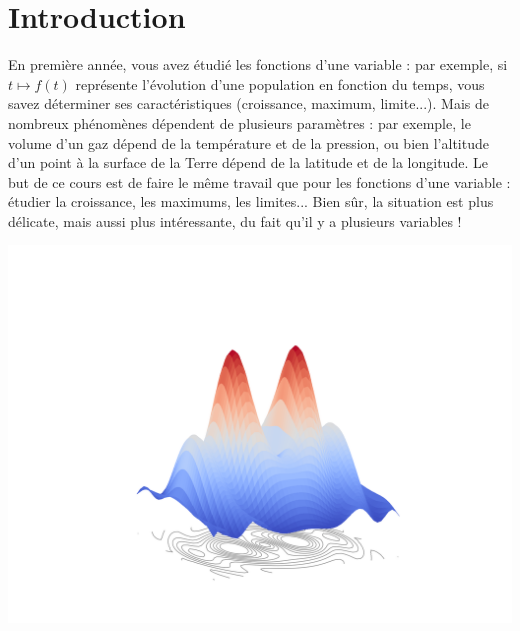 \documentclass[11pt, class=report,crop=false]{standalone}
\begin{document}
\newcommand{\myscale}{1}





\section{Introduction}

En première année, vous avez étudié les fonctions d'une variable : par exemple, si $t\mapsto f(t)$ représente l'évolution d'une population en fonction du temps, vous savez déterminer ses caractéristiques (croissance, maximum, limite...). 
Mais de nombreux phénomènes dépendent de plusieurs paramètres : par exemple, le volume d'un gaz dépend de la température et de la pression, ou bien l'altitude  d'un point à la surface de la Terre dépend de la latitude et de la longitude. Le but de ce cours est de faire le même travail que pour les fonctions d'une variable : étudier la croissance, les maximums, les limites... Bien sûr, la situation est plus délicate, mais aussi plus intéressante, du fait qu'il y a plusieurs variables !

\begin{center}
    \includegraphics[trim={4cm 1cm 3cm 3cm}, clip, scale=\myscale, scale=0.8]{figures/fonctions-niveau-3a}
\end{center}
\end{document}

